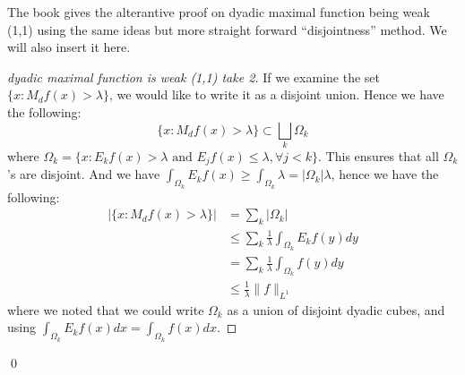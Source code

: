 The book gives the alterantive proof on dyadic maximal function being weak (1,1) using the same ideas but more straight forward ``disjointness'' method. We will also insert it here.
\begin{proof}[dyadic maximal function is weak (1,1) take 2]
    If we examine the set $\{x: M_df(x)>\lambda\}$, we would like to write it as a disjoint union. Hence we have the following:
    \begin{equation*}
        \{x: M_df(x)>\lambda\}\subset\bigsqcup_k\Omega_k
    \end{equation*}
    where $\Omega_k=\{x: E_kf(x)>\lambda \text{ and } E_jf(x)\leq\lambda, \forall j<k\}$. This ensures that all $\Omega_k$'s are disjoint. And we have $\int_{\Omega_k}E_kf(x)\geq\int_{\Omega_k}\lambda=|\Omega_k|\lambda$, hence we have the following:
    \begin{align*}
        |\{x: M_df(x)>\lambda\}|&=\sum_{k}|\Omega_k|\\
        &\leq\sum_{k}\frac{1}{\lambda}\int_{\Omega_k}E_kf(y)dy\\
        &=\sum_{k}\frac{1}{\lambda}\int_{\Omega_k}f(y)dy\\
        &\leq\frac{1}{\lambda}\|f\|_{L^1}
    \end{align*}
    where we noted that we could write $\Omega_k$ as a union of disjoint dyadic cubes, and using $\int_{\Omega_k}E_kf(x)dx=\int_{\Omega_k}f(x)dx$.
\end{proof}
\qed



